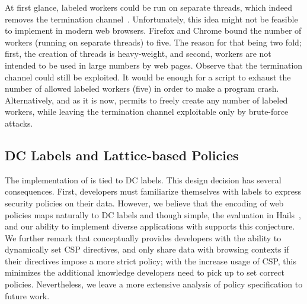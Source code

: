 

At first glance, labeled workers could be run on separate threads, which indeed
removes the termination channel~\cite{stefan:addressing-covert}.  Unfortunately,
this idea might not be feasible to implement in modern web browsers. Firefox and
Chrome bound the number of workers (running on separate threads) to five. The
reason for that being two fold; first, the creation of threads is heavy-weight,
and second, workers are not intended  to be used in large numbers
by web pages. 
Observe that the termination channel could still be exploited.  It would be
enough for a script to exhaust the number of allowed labeled workers (five) in
order to make a program crash.
Alternatively, and as it is now, \sys{}
permits to freely create any number of labeled workers, while leaving the
termination channel exploitable only by brute-force attacks.


\subsection{DC Labels and Lattice-based Policies}
\label{sec:discussion:lattice}

The implementation of \sys{} is tied to DC labels.
%
This design decision has several consequences.
%
First, developers must familiarize themselves with labels to express
security policies on their data.
%
However, we believe that the encoding of web policies maps naturally
to DC labels and though simple, the evaluation in
Hails~, and our ability to implement diverse
applications with \sys{} supports this conjecture.
%
We further remark that \sys{} conceptually provides developers with
the ability to dynamically set CSP directives, and only share data
with browsing contexts if their directives impose a more strict
policy; with the increase usage of CSP, this minimizes the additional
knowledge developers need to pick up to set correct policies.
%
Nevertheless, we leave a more extensive analysis of policy
specification to future work.
 
